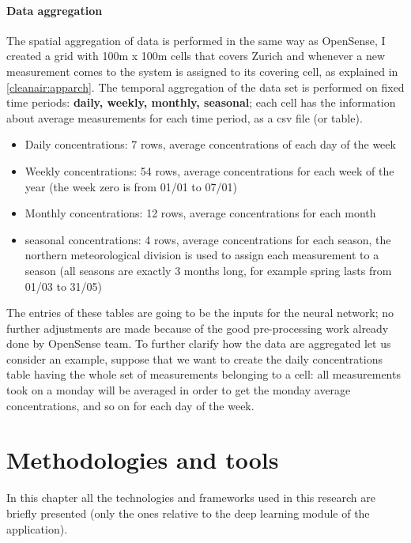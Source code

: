 \documentclass[11pt,a4paper,titlepage]{book}
\begin{document}
\subsubsection{Data aggregation}
\label{cleanair:data-aggregation}
The spatial aggregation of data is performed in the same way as OpenSense, I created a grid with 100m x 100m cells that covers Zurich and whenever a new measurement comes to the system is assigned to its covering cell, as explained in \ref{cleanair:apparch}.
\newline
\newline
The temporal aggregation of the data set is performed on fixed time periods: \textbf{daily, weekly, monthly, seasonal}; each cell has the information about average measurements for each time period, as a csv file (or table). 
\begin{itemize}
    \item Daily concentrations: 7 rows, average concentrations of each day of the week
    \item Weekly concentrations: 54 rows, average concentrations for each week of the year (the week zero is from 01/01 to 07/01)
    \item Monthly concentrations: 12 rows, average concentrations for each month
    \item seasonal concentrations: 4 rows, average concentrations for each season, the northern meteorological division is used to assign each measurement to a season (all seasons are exactly 3 months long, for example spring lasts from 01/03 to 31/05)
\end{itemize}
The entries of these tables are going to be the inputs for the neural network; no further adjustments are made because of the good pre-processing work already done by OpenSense team.
\newline
\newline
To further clarify how the data are aggregated let us consider an example, suppose that we want to create the daily concentrations table having the whole set of measurements belonging to a cell: all measurements took on a monday will be averaged in order to get the monday average concentrations, and so on for each day of the week.

\chapter{Methodologies and tools}
In this chapter all the technologies and frameworks used in this research are briefly presented (only the ones relative to the deep learning module of the application).
\end{document}
